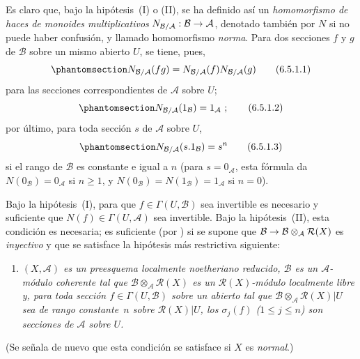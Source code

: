 \documentclass[oneside,10pt]{amsart}
\makeatletter
\renewcommand{\leq}{\leqslant}
\renewcommand{\geq}{\geqslant}
\newcommand{\ega@arrow}[2]{\mathchoice{#1}{#2}{#2}{#2}}
\renewcommand{\to}{\ega@arrow{\longrightarrow}{\rightarrow}}
\let\EGAOriginalLabel\label
\renewcommand{\label}[1]{\phantomsection\EGAOriginalLabel{#1}}
\makeatother
\begin{document}
\begin{env}[6.5.1]
Es claro que, bajo la hipótesis~(I) o (II), se ha definido así un \emph{homomorfismo de haces de monoides multiplicativos} $N_{\mathcal{B}/\mathcal{A}}:\mathcal{B}\to\mathcal{A}$, denotado también por $N$ si no puede haber confusión, y llamado homomorfismo \emph{norma}.
Para dos secciones $f$ y $g$ de $\mathcal{B}$ sobre un mismo abierto $U$, se tiene, pues,
\[
\label{II.6.5.1.1-fr}
N_{\mathcal{B}/\mathcal{A}}(fg)
=N_{\mathcal{B}/\mathcal{A}}(f)N_{\mathcal{B}/\mathcal{A}}(g)
\tag{6.5.1.1}
\]
para las secciones correspondientes de $\mathcal{A}$ sobre $U$;
\[
\label{II.6.5.1.2-fr}
N_{\mathcal{B}/\mathcal{A}}(1_{\mathcal{B}})=1_{\mathcal{A}}~;
\tag{6.5.1.2}
\]
por último, para toda sección $s$ de $\mathcal{A}$ sobre $U$,
\[
\label{II.6.5.1.3-fr}
N_{\mathcal{B}/\mathcal{A}}(s.1_{\mathcal{B}})=s^n
\tag{6.5.1.3}
\]
si el rango de $\mathcal{B}$ es constante e igual a $n$ (para $s=0_{\mathcal{A}}$, esta fórmula da $N(0_{\mathcal{B}})=0_{\mathcal{A}}$ si $n\geq1$, y $N(0_{\mathcal{B}})=N(1_{\mathcal{B}})=1_{\mathcal{A}}$ si $n=0$).

Bajo la hipótesis~(I), para que $f\in\Gamma(U,\mathcal{B})$ sea invertible es necesario y suficiente que $N(f)\in\Gamma(U,\mathcal{A})$ sea invertible.
Bajo la hipótesis~(II), esta condición es necesaria;
es suficiente (por ) si se supone que $\mathcal{B}\to\mathcal{B}\otimes_{\mathcal{A}}\mathcal{R}(X)$ es \emph{inyectivo} y que se satisface la hipótesis más restrictiva siguiente:
\begin{enumerate}
  \item[{\rm(II~\emph{bis})}] \emph{$(X,\mathcal{A})$ es un preesquema localmente noetheriano reducido, $\mathcal{B}$ es un $\mathcal{A}$-módulo coherente tal que $\mathcal{B}\otimes_{\mathcal{A}}\mathcal{R}(X)$ es un $\mathcal{R}(X)$-módulo localmente libre y, para toda sección $f\in\Gamma(U,\mathcal{B})$ sobre un abierto tal que $\mathcal{B}\otimes_{\mathcal{A}}\mathcal{R}(X)|U$ sea de rango constante~$n$ sobre $\mathcal{R}(X)|U$, los $\sigma_j(f)$ ($1\leq j\leq n$) son secciones de $\mathcal{A}$ sobre $U$.}
\end{enumerate}

(Se señala de nuevo que esta condición se satisface si $X$ es \emph{normal}.)
\end{env}
\end{document}
